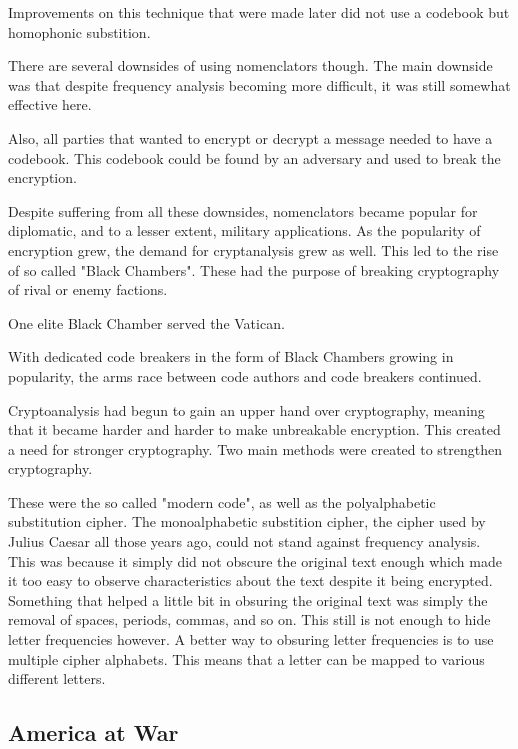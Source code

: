 \documentclass{article}
\begin{document}
    Improvements on this technique that were made later did not use a codebook
    but homophonic substition.

    There are several downsides of using nomenclators though. The main
    downside was that despite frequency analysis becoming more difficult,
    it was still somewhat effective here.
    
    Also, all parties that wanted to encrypt or decrypt a message needed
    to have a codebook. This codebook could be found by an adversary and
    used to break the encryption.

    Despite suffering from all these downsides, nomenclators became popular
    for diplomatic, and to a lesser extent, military applications.
    As the popularity of encryption grew, the demand for cryptanalysis grew
    as well.
    This led to the rise of so called "Black Chambers". These had the purpose
    of breaking cryptography of rival or enemy factions.

    One elite Black Chamber served the Vatican.

    With dedicated code breakers in the form of Black Chambers
    growing in popularity, the arms race
    between code authors and code breakers continued.

    Cryptoanalysis had begun to gain an upper hand over cryptography,
    meaning that it became harder and harder to make unbreakable
    encryption.
    This created a need for stronger cryptography.
    Two main methods were created to strengthen cryptography.

    These were the so called "modern code", as well as the polyalphabetic substitution
    cipher.
    The monoalphabetic substition cipher, the cipher used by Julius Caesar all those
    years ago, could not stand against frequency analysis. This was
    because it simply did not obscure the original text enough
    which made it too easy to observe characteristics about the text
    despite it being encrypted. Something that helped a little bit
    in obsuring the original text was simply the removal of spaces, periods, commas,
    and so on.
    This still is not enough to hide letter frequencies however.
    A better way to obsuring letter frequencies is to use multiple cipher alphabets.
    This means that a letter can be mapped to various different letters.

    \subsection{America at War} 
\end{document}
